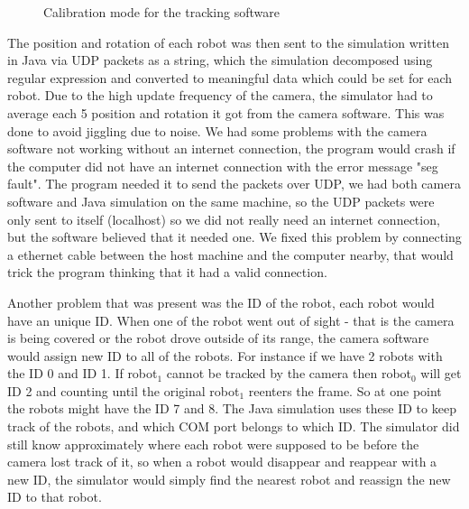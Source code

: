 \begin{figure}
     \hfill
    
            \caption[Calibrating colors]{Calibration mode for the tracking software}
            \label{fig:calibration}
\end{figure}
\newpage
The position and rotation of each robot was then sent to the simulation written in Java via UDP packets as a string, which the simulation decomposed using regular expression and converted to meaningful data which could be set for each robot. Due to the high update frequency of the camera, the simulator had to average each 5 position and rotation it got from the camera software. This was done to avoid jiggling due to noise. We had some problems with the camera software not working without an internet connection, the program would crash if the computer did not have an internet connection with the error message "seg fault". The program needed it to send the packets over UDP, we had both camera software and Java simulation on the same machine, so the UDP packets were only sent to itself (localhost) so we did not really need an internet connection, but the software believed that it needed one. We fixed this problem by connecting a ethernet cable between the host machine and the computer nearby, that would trick the program thinking that it had a valid connection.

Another problem that was present was the ID of the robot, each robot would have an unique ID. When one of the robot went out of sight - that is the camera is being covered or the robot drove outside of its range, the camera software would assign new ID to all of the robots. For instance if we have 2 robots with the ID 0 and ID 1. If robot$_1$ cannot be tracked by the camera then robot$_0$ will get ID 2 and counting until the original robot$_1$ reenters the frame. So at one point the robots might have the ID 7 and 8. The Java simulation uses these ID to keep track of the robots, and which COM port belongs to which ID. The simulator did still know approximately where each robot were supposed to be before the camera lost track of it, so when a robot would disappear and reappear with a new ID, the simulator would simply find the nearest robot and reassign the new ID to that robot.

